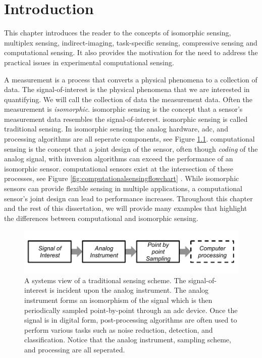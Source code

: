 \chapter{Introduction}\label{chap:Introduction}


This chapter introduces the reader to the concepts of \gls{isomorphic sensing}, \gls{multiplex sensing}, \gls{indirect-imaging}, \gls{task-specific sensing}, \gls{compressive sensing} and \gls{computational sensing}. It also provides the motivation for the need to address the practical issues in experimental computational sensing. 

A \gls{measurement} is a process that converts a physical phenomena to a collection of data. The signal-of-interest is the physical phenomena that we are interested in quantifying. We will call the collection of data the measurement data. Often the measurement is \emph{\gls{isomorphic}}. \Gls{isomorphic sensing} is the concept that a sensor's measurement data resembles the signal-of-interest. \Gls{isomorphic sensing} is called \gls{traditional sensing}. In isomorphic sensing the analog hardware, \acrfull{adc}, and processing algorithms are all seperate components, see Figure \ref{fig:isomorphicsesingflowchart}. \Gls{computational sensing} is the concept that a joint design of the sensor, often though \emph{coding} of the analog signal, with inversion algorithms can exceed the performance of an isomorphic sensor. \Glspl{computational sensor} exist at the intersection of these processes, see Figure \ref{fig:computationalsensingflowchart} \cite{neifeld2006taskSpecificSensing}. While \gls{isomorphic} sensors can provide flexible sensing in multiple applications, a \gls{computational sensor}'s joint design can lead to performance increases. Throughout this chapter and the rest of this dissertation, we will provide many examples that highlight the differences between computational and isomorphic sensing. 

\begin{figure}
    \centering
    \includegraphics[scale=1]{isomorphicsensorflowchart}
    \caption{A systems view of a traditional sensing scheme. The signal-of-interest is incident upon the analog instrument. The analog instrument forms an isomorphism of the signal which is then periodically sampled point-by-point through an \gls{adc} device. Once the signal is in digital form, post-processing algorithms are often used to perform various tasks such as noise reduction, detection, and classification. Notice that the analog instrument, sampling scheme, and processing are all seperated. }
    \label{fig:isomorphicsesingflowchart}
\end{figure}


